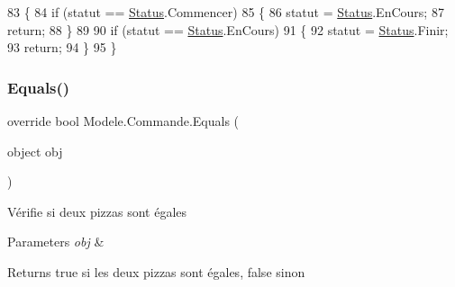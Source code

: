 \begin{DoxyCode}
83         \{
84             \textcolor{keywordflow}{if} (statut == \hyperlink{namespaceModele_a7de67c7bf55b42ee1c5fea81ed793eb1}{Status}.Commencer)
85             \{
86                 statut = \hyperlink{namespaceModele_a7de67c7bf55b42ee1c5fea81ed793eb1}{Status}.EnCours;
87                 \textcolor{keywordflow}{return};
88             \}
89 
90             \textcolor{keywordflow}{if} (statut == \hyperlink{namespaceModele_a7de67c7bf55b42ee1c5fea81ed793eb1}{Status}.EnCours)
91             \{
92                 statut = \hyperlink{namespaceModele_a7de67c7bf55b42ee1c5fea81ed793eb1}{Status}.Finir;
93                 \textcolor{keywordflow}{return};
94             \}
95         \}
\end{DoxyCode}
\mbox{\label{classModele_1_1Commande_a0a87dd164ca4c925c15fc4ec122f39a7}} 
\subsubsection{\texorpdfstring{Equals()}{Equals()}}
{\footnotesize\ttfamily override bool Modele.\+Commande.\+Equals (\begin{DoxyParamCaption}\item[{object}]{obj }\end{DoxyParamCaption})\hspace{0.3cm}{\ttfamily [inline]}}



Vérifie si deux pizzas sont égales 


\begin{DoxyParams}{Parameters}
{\em obj} & \\
\hline
\end{DoxyParams}
\begin{DoxyReturn}{Returns}
true si les deux pizzas sont égales, false sinon
\end{DoxyReturn}

